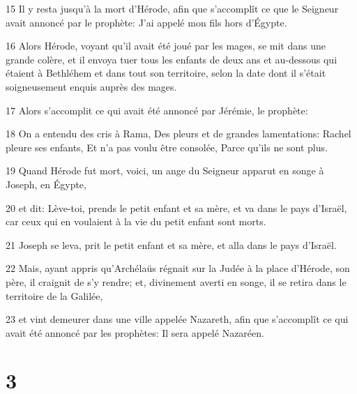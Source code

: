 \par 15 Il y resta jusqu'à la mort d'Hérode, afin que s'accomplît ce que le Seigneur avait annoncé par le prophète: J'ai appelé mon fils hors d'Égypte.
\par 16 Alors Hérode, voyant qu'il avait été joué par les mages, se mit dans une grande colère, et il envoya tuer tous les enfants de deux ans et au-dessous qui étaient à Bethléhem et dans tout son territoire, selon la date dont il s'était soigneusement enquis auprès des mages.
\par 17 Alors s'accomplit ce qui avait été annoncé par Jérémie, le prophète:
\par 18 On a entendu des cris à Rama, Des pleurs et de grandes lamentations: Rachel pleure ses enfants, Et n'a pas voulu être consolée, Parce qu'ils ne sont plus.
\par 19 Quand Hérode fut mort, voici, un ange du Seigneur apparut en songe à Joseph, en Égypte,
\par 20 et dit: Lève-toi, prends le petit enfant et sa mère, et va dans le pays d'Israël, car ceux qui en voulaient à la vie du petit enfant sont morts.
\par 21 Joseph se leva, prit le petit enfant et sa mère, et alla dans le pays d'Israël.
\par 22 Mais, ayant appris qu'Archélaüs régnait sur la Judée à la place d'Hérode, son père, il craignit de s'y rendre; et, divinement averti en songe, il se retira dans le territoire de la Galilée,
\par 23 et vint demeurer dans une ville appelée Nazareth, afin que s'accomplît ce qui avait été annoncé par les prophètes: Il sera appelé Nazaréen.

\chapter{3}

